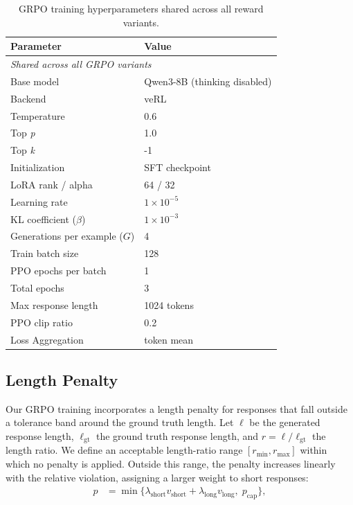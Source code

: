 \documentclass{article} %
\begin{document}
\begin{table}[h]
\centering
\small
\begin{tabular}{ll}
\toprule
\textbf{Parameter} & \textbf{Value} \\
\midrule
\multicolumn{2}{l}{\emph{Shared across all GRPO variants}} \\
Base model & Qwen3-8B (thinking disabled)\\
Backend & veRL \\
Temperature & 0.6 \\
Top \textit{p} & 1.0 \\
Top \textit{k} & -1 \\
Initialization & SFT checkpoint \\
LoRA rank / alpha & 64 / 32 \\
Learning rate & $1 \times 10^{-5}$ \\
KL coefficient ($\beta$) & $1 \times 10^{-3}$ \\
Generations per example ($G$) & 4 \\
Train batch size & 128 \\
PPO epochs per batch & 1 \\
Total epochs & 3 \\
Max response length & 1024 tokens \\
PPO clip ratio & 0.2 \\
Loss Aggregation & token mean \\

\bottomrule
\end{tabular}
\caption{GRPO training hyperparameters shared across all reward variants.}
\label{tab:hyperparams}
\end{table}

\subsection{Length Penalty}
\label{app:length_penalty}

Our GRPO training incorporates a length penalty for responses that fall outside a tolerance band around the ground truth length.
Let $\ell$ be the generated response length, $\ell_{\mathrm{gt}}$ the ground truth response length, and $r = \ell / \ell_{\mathrm{gt}}$ the length ratio. We define an acceptable length-ratio range $[r_{\min}, r_{\max}]$ within which no penalty is applied. Outside this range, the penalty increases linearly with the relative violation, assigning a larger weight to short responses:
\begin{align}
p &= \min\{\lambda_{\mathrm{short}} v_{\mathrm{short}}
        + \lambda_{\mathrm{long}} v_{\mathrm{long}},\; p_{\mathrm{cap}}\},
\end{align}
\end{document}
